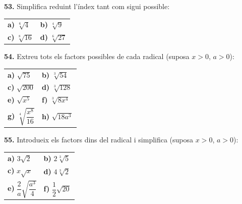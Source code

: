 \documentclass[13pt,a4paper]{extarticle}
\begin{document}
\par\noindent\begin{minipage}{\linewidth}
\textbf{53.} Simplifica reduint l'índex tant com sigui possible:\par

\begin{tabular}{@{}p{.46\linewidth}p{.46\linewidth}@{}}
\textbf{a)} $\sqrt[6]{4}$ & \textbf{b)} $\sqrt[4]{9}$ \\[2pt]
\textbf{c)} $\sqrt[8]{16}$ & \textbf{d)} $\sqrt[6]{27}$ \\[2pt]
\end{tabular}\par
\end{minipage}\par\vspace{1.6mm}
\par\noindent\begin{minipage}{\linewidth}
\textbf{54.} Extreu tots els factors possibles de cada radical (suposa $x>0$, $a>0$):\par

\begin{tabular}{@{}p{.46\linewidth}p{.46\linewidth}@{}}
\textbf{a)} $\sqrt{75}$ & \textbf{b)} $\sqrt[3]{54}$ \\[2pt]
\textbf{c)} $\sqrt{200}$ & \textbf{d)} $\sqrt[3]{128}$ \\[2pt]
\textbf{e)} $\sqrt{x^5}$ & \textbf{f)} $\sqrt[3]{8x^4}$ \\[2pt]
\textbf{g)} $\sqrt[4]{\dfrac{x^8}{16}}$ & \textbf{h)} $\sqrt{18a^3}$ \\[2pt]
\end{tabular}\par
\end{minipage}\par\vspace{1.6mm}
\par\noindent\begin{minipage}{\linewidth}
\textbf{55.} Introdueix els factors dins del radical i simplifica (suposa $x>0$, $a>0$):\par

\begin{tabular}{@{}p{.46\linewidth}p{.46\linewidth}@{}}
\textbf{a)} $3\sqrt{2}$ & \textbf{b)} $2\sqrt[3]{5}$ \\[2pt]
\textbf{c)} $x\sqrt{x}$ & \textbf{d)} $4\sqrt[3]{2}$ \\[2pt]
\textbf{e)} $\dfrac{2}{a}\sqrt{\dfrac{a^3}{4}}$ & \textbf{f)} $\dfrac{1}{2}\sqrt{20}$ \\[2pt]
\end{tabular}\par
\end{minipage}\par\vspace{1.6mm}
\end{document}
